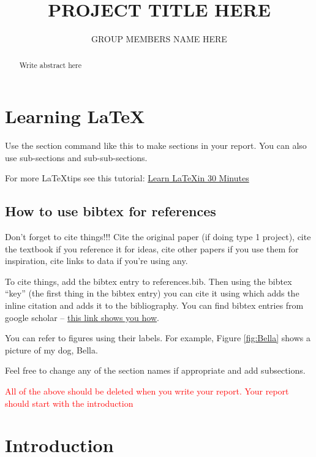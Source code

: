 \documentclass[fontsize=12pt]{amsart}
\title{PROJECT TITLE HERE}
\author{GROUP MEMBERS NAME HERE}
\begin{document}
\maketitle


\begin{abstract}
    Write abstract here
\end{abstract}



\section{Learning \LaTeX}


Use the section command like this to make sections in your report. You can also use sub-sections and sub-sub-sections.

For more \LaTeX tips see this tutorial: \href{https://www.overleaf.com/learn/latex/Learn_LaTeX_in_30_minutes}{Learn \LaTeX in 30 Minutes}

\subsection{How to use bibtex for references}

Don't forget to cite things!!! Cite the original paper (if doing type 1 project), cite the textbook if you reference it for ideas, cite other papers if you use them for inspiration, cite links to data if you're using any. 


To cite things, add the bibtex entry to references.bib. 
Then using the bibtex ``key'' (the first thing in the bibtex entry) you can cite it using \cite{haberman_mathematical_1998} which adds the inline citation and adds it to the bibliography.
You can find bibtex entries from google scholar -- \href{https://libguides.usask.ca/c.php?g=218034&p=1445751}{this link shows you how}. 

You can refer to figures using their labels. For example, Figure \ref{fig:Bella} shows a picture of my dog, Bella.

Feel free to change any of the section names if appropriate and add subsections. 


\textcolor{red}{All of the above should be deleted when you write your report. Your report should start with the introduction}




\section{Introduction}
\end{document}
